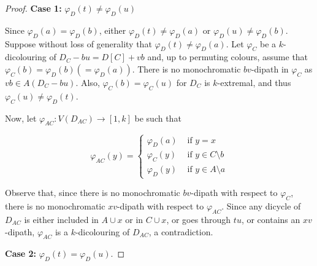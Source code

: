 \begin{proof}
    \smallskip 
    
    \noindent\textbf{Case 1:} $\varphi_D(t) \neq \varphi_D(u)$ 

    
    Since $\varphi_D(a) = \varphi_D(b)$, either $\varphi_D(t) \neq \varphi_D(a)$ or $\varphi_D(u) \neq \varphi_D(b)$. Suppose without loss of generality that $\varphi_D(t) \neq \varphi_D(a)$. 
    Let $\varphi_C$ be a $k$-dicolouring of $D_{C} - bu = D[C] +vb$ and, up to permuting colours, assume  that $\varphi_C(b) = \varphi_D(b) (= \varphi_D(a))$. There is no monochromatic $bv$-dipath in $\varphi_{C}$ as $vb \in A(D_C - bu)$. Also, $\varphi_{C}(b) = \varphi_{C}(u)$ for $D_C$ is $k$-extremal, and thus $\varphi_{C}(u) \neq \varphi_D(t)$. 
    
    Now, let $\varphi_{AC} : V(D_{AC}) \to [1,k]$ be such that 
    
$$
\varphi_{AC}(y) = \left\{
    \begin{array}{ll}
        \varphi_D(a) & \text{ if } y=x \\
        \varphi_{C}(y) & \text{ if } y \in C \setminus b \\
        \varphi_D(y) &  \text{ if } y \in A \setminus a
    \end{array}
\right.
$$



    Observe that, since there is no monochromatic $bv$-dipath with respect to $\varphi_C$, there is no monochromatic $xv$-dipath with respect to $\varphi_{AC}$. 
    Since any dicycle of $D_{AC}$ is either included in $A \cup x$ or in $C \cup x$,  or goes through $tu$, or contains an  $xv$-dipath, $\varphi_{AC}$ is a $k$-dicolouring of $D_{AC}$, a contradiction.

    \smallskip

    
    \noindent\textbf{Case 2:} $\varphi_D(t) = \varphi_D(u)$. 

    
    

\end{proof}
